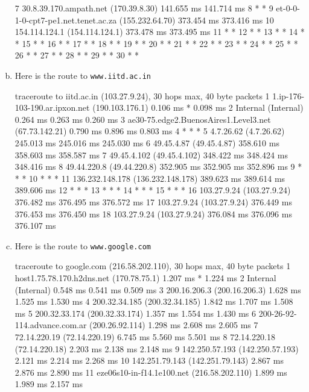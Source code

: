 \documentclass{article}
\begin{document}
\begin{enumerate}[a.]
\begin{code}
 7  30.8.39.170.ampath.net (170.39.8.30)  141.655 ms  141.714 ms
 8  * *
 9  et-0-0-1-0-cpt7-pe1.net.tenet.ac.za (155.232.64.70)  373.454 ms  373.416 ms
10  154.114.124.1 (154.114.124.1)  373.478 ms  373.495 ms
11  * *
12  * *
13  * *
14  * *
15  * *
16  * *
17  * *
18  * *
19  * *
20  * *
21  * *
22  * *
23  * *
24  * *
25  * *
26  * *
27  * *
28  * *
29  * *
30  * *
\end{code}
\item Here is the route to {\tt www.iitd.ac.in}
\begin{code} 
traceroute to iitd.ac.in (103.27.9.24), 30 hops max, 40 byte packets
 1  1.ip-176-103-190.ar.ipxon.net (190.103.176.1)  0.106 ms *  0.098 ms
 2  Internal (Internal)  0.264 ms  0.263 ms  0.260 ms
 3  ae30-75.edge2.BuenosAires1.Level3.net (67.73.142.21)  0.790 ms  0.896 ms  0.803 ms
 4  * * *
 5  4.7.26.62 (4.7.26.62)  245.013 ms  245.016 ms  245.030 ms
 6  49.45.4.87 (49.45.4.87)  358.610 ms  358.603 ms  358.587 ms
 7  49.45.4.102 (49.45.4.102)  348.422 ms  348.424 ms  348.416 ms
 8  49.44.220.8 (49.44.220.8)  352.905 ms  352.905 ms  352.896 ms
 9  * * *
10  * * *
11  136.232.148.178 (136.232.148.178)  389.623 ms  389.614 ms  389.606 ms
12  * * *
13  * * *
14  * * *
15  * * *
16  103.27.9.24 (103.27.9.24)  376.482 ms  376.495 ms  376.572 ms
17  103.27.9.24 (103.27.9.24)  376.449 ms  376.453 ms  376.450 ms
18  103.27.9.24 (103.27.9.24)  376.084 ms  376.096 ms  376.107 ms
\end{code}
\item Here is the route to {\tt www.google.com}
\begin{code}
 traceroute to google.com (216.58.202.110), 30 hops max, 40 byte packets
 1  host1.75.78.170.h2dns.net (170.78.75.1)  1.207 ms *  1.224 ms
 2  Internal (Internal)  0.548 ms  0.541 ms  0.509 ms
 3  200.16.206.3 (200.16.206.3)  1.628 ms  1.525 ms  1.530 ms
 4  200.32.34.185 (200.32.34.185)  1.842 ms  1.707 ms  1.508 ms
 5  200.32.33.174 (200.32.33.174)  1.357 ms  1.554 ms  1.430 ms
 6  200-26-92-114.advance.com.ar (200.26.92.114)  1.298 ms  2.608 ms  2.605 ms
 7  72.14.220.19 (72.14.220.19)  6.745 ms  5.560 ms  5.501 ms
 8  72.14.220.18 (72.14.220.18)  2.203 ms  2.138 ms  2.148 ms
 9  142.250.57.193 (142.250.57.193)  2.121 ms  2.214 ms  2.268 ms
10  142.251.79.143 (142.251.79.143)  2.867 ms  2.876 ms  2.890 ms
11  eze06s10-in-f14.1e100.net (216.58.202.110)  1.899 ms  1.989 ms  2.157 ms
\end{code}


\end{enumerate}
\end{document}
